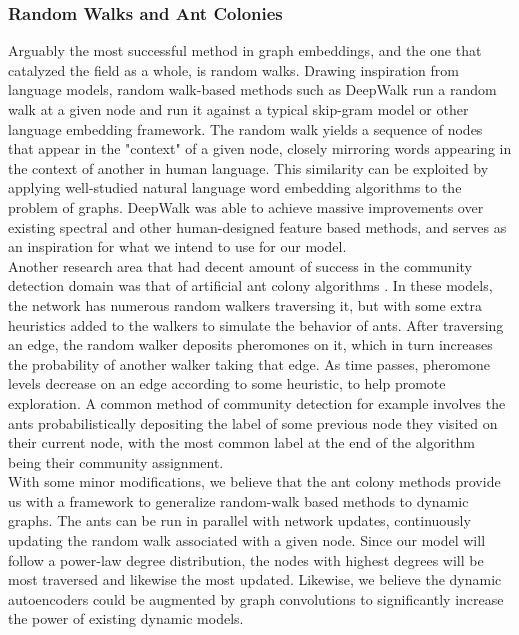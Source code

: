\documentclass[10pt]{article}
\begin{document}
\subsubsection{Random Walks and Ant Colonies}

Arguably the most successful method in graph embeddings, and the one that catalyzed the field as a whole, is random walks. Drawing inspiration from language models, random walk-based methods such as DeepWalk \cite{perozzi2014deepwalk} run a random walk at a given node and run it against a typical skip-gram model or other language embedding framework. The random walk yields a sequence of nodes that appear in the "context" of a given node, closely mirroring words appearing in the context of another in human language. This similarity can be exploited by applying well-studied natural language word embedding algorithms to the problem of graphs. DeepWalk was able to achieve massive improvements over existing spectral and other human-designed feature based methods, and serves as an inspiration for what we intend to use for our  model. \\

Another research area that had decent amount of success in the community detection domain was that of artificial ant colony algorithms \cite{bertelle2006organization, zhou2015ant}. In these models, the network has numerous random walkers traversing it, but with some extra heuristics added to the walkers to simulate the behavior of ants. After traversing an edge, the random walker deposits pheromones on it, which in turn increases the probability of another walker taking that edge. As time passes, pheromone levels decrease on an edge according to some heuristic, to help promote exploration. A common method of community detection for example involves the ants probabilistically depositing the label of some previous node they visited on their current node, with the most common label at the end of the algorithm being their community assignment. \\

With some minor modifications, we believe that the ant colony methods provide us with a framework to generalize random-walk based methods to dynamic graphs. The ants can be run in parallel with network updates, continuously updating the random walk associated with a given node. Since our model will follow a power-law degree distribution, the nodes with highest degrees will be most traversed and likewise the most updated. Likewise, we believe the dynamic autoencoders could be augmented by graph convolutions to significantly increase the power of existing dynamic models. \\
\end{document}
